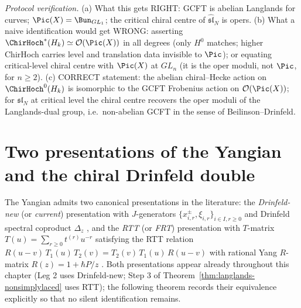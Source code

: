 \begin{remark}
\emph{Protocol verification.} (a) What this gets RIGHT: GCFT is
abelian Langlands for curves; $\Pic(X) = \Bun_{GL_1}$; the critical
chiral centre of $\widehat{\mathfrak{sl}}_N$ is opers. (b) What a
naive identification would get WRONG: asserting
$\ChirHoch^*(H_k) \simeq \mathcal{O}(\Pic(X))$ in all degrees (only
$H^0$ matches; higher ChirHoch carries level and translation data
invisible to $\Pic$); or equating critical-level chiral centre with
$\Pic(X)$ at $GL_n$ (it is the oper moduli, not $\Pic$, for $n\ge 2$).
(c) CORRECT statement: the abelian chiral--Hecke action on
$\ChirHoch^0(H_k)$ is isomorphic to the GCFT Frobenius action on
$\mathcal{O}(\Pic(X))$; for $\mathfrak{sl}_N$ at critical level the
chiral centre recovers the oper moduli of the Langlands-dual group,
i.e.\ non-abelian GCFT in the sense of Beilinson--Drinfeld.
\end{remark}

\section{Two presentations of the Yangian and the chiral Drinfeld double}
\label{sec:yangian-two-presentations-drinfeld-double}

The Yangian admits two canonical presentations in the literature: the
\emph{Drinfeld-new} (or \emph{current}) presentation with $J$-generators
$\{x_{i,r}^{\pm}, \xi_{i,r}\}_{i\in I, r\ge 0}$ and Drinfeld spectral
coproduct $\Delta_z$ \cite{Drinfeld88}, and the \emph{RTT} (or
\emph{FRT}) presentation with $T$-matrix
$T(u) = \sum_{r\ge 0} t^{(r)} u^{-r}$ satisfying the RTT relation
$R(u-v)\, T_1(u)\, T_2(v) = T_2(v)\, T_1(u)\, R(u-v)$ with rational
Yang $R$-matrix $R(z) = 1 + \hbar P/z$ \cite{FaddeevReshetikhinTakhtajan89}.
Both presentations appear already throughout this chapter (Leg 2 uses
Drinfeld-new; Step 3 of Theorem~\ref{thm:langlands-nonsimplylaced} uses
RTT); the following theorem records their equivalence explicitly so
that no silent identification remains.

